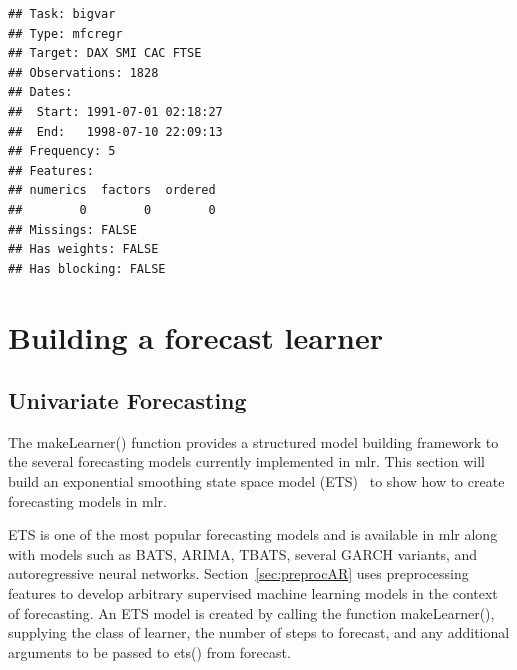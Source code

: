 \documentclass[12pt]{article}%
\makeatletter
\theoremstyle{definition}
\newcommand\code{\@codex}
\def\@codex#1{{\normalfont\ttfamily\hyphenchar\font=-1 #1}}
\newcommand{\pkg}[1]{{\fontseries{b}\selectfont #1}}
\makeatother
\begin{document}
\singlespacing
\begin{knitrout}
\color{fgcolor}\begin{kframe}
\begin{alltt}
 \hlkwb{=} \hlstd{(} \hlstd{=} \hlstd{,}
                                       
                                       \hlstd{=} \hlstd{,}
                                       \hlstd{=} \hlstd{)}
\end{alltt}
\begin{verbatim}
## Task: bigvar
## Type: mfcregr
## Target: DAX SMI CAC FTSE
## Observations: 1828
## Dates:
##  Start: 1991-07-01 02:18:27 
##  End:   1998-07-10 22:09:13
## Frequency: 5
## Features:
## numerics  factors  ordered 
##        0        0        0 
## Missings: FALSE
## Has weights: FALSE
## Has blocking: FALSE
\end{verbatim}
\end{kframe}
\end{knitrout}
\doublespacing

\section{Building a forecast learner}
\label{seq:build}
\subsection{Univariate Forecasting}
\label{seq:buildAndTuneUni}

The \code{makeLearner()} function provides a structured model building framework to the several forecasting models currently implemented in \pkg{mlr}. This section will build an exponential smoothing state space model (ETS)~\cite{etsMod} to show how to create forecasting models in \pkg{mlr}.

ETS is one of the most popular forecasting models and is available in \pkg{mlr} along with models such as BATS, ARIMA, TBATS, several GARCH variants, and autoregressive neural networks. Section~\ref{sec:preprocAR} uses preprocessing features to develop arbitrary supervised machine learning models in the context of forecasting. An ETS model is created by calling the function \code{makeLearner()}, supplying the class of learner, the number of steps to forecast, and any additional arguments to be passed to \code{ets()} from \pkg{forecast}.
\end{document}
